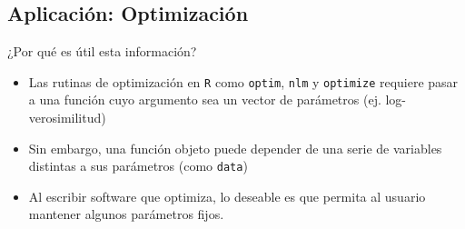 \documentclass{article}\usepackage[]{graphicx}\usepackage[]{color}
\begin{document}
  \subsection{Aplicación: Optimización}
  ¿Por qué es útil esta información?
  \begin{itemize}
    \item Las rutinas de optimización en \texttt{R} como \texttt{optim}, \texttt{nlm} y \texttt{optimize} requiere pasar a una función cuyo argumento sea un vector de parámetros (ej. log-verosimilitud)
    \item Sin embargo, una función objeto puede depender de una serie de variables distintas a sus parámetros (como \texttt{data}) 
    \item Al escribir software que optimiza, lo deseable es que permita al usuario mantener algunos parámetros fijos.
  \end{itemize}
  
\end{document}
